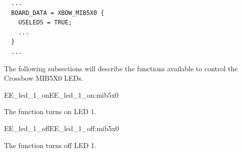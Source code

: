 \begin{lstlisting}
  ...
  BOARD_DATA = XBOW_MIB5X0 {
    USELEDS = TRUE;
    ...
  }
  ...
\end{lstlisting}

The following subsections will describe the functions available to
control the Crossbow MIB5X0 LEDs.


\begin{function_nopb2}{EE\_led\_1\_on}{EE_led_1_on:mib5x0}
  
  \begin{fundescription}
    The function turns on LED 1.
  \end{fundescription}
  
  
  
\end{function_nopb2}

\begin{function_nopb2}{EE\_led\_1\_off}{EE_led_1_off:mib5x0}
  
  \begin{fundescription}
    The function turns off LED 1.
  \end{fundescription}
  
  
  
\end{function_nopb2}

